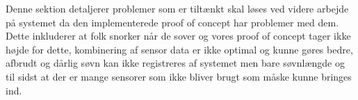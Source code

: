 Denne sektion detaljerer problemer som er tiltænkt skal løses ved videre arbejde på systemet da den implementerede proof of concept har problemer med dem. 
Dette inkluderer at folk snorker når de sover og vores proof of concept tager ikke højde for dette, kombinering af sensor data er ikke optimal og kunne gøres bedre, afbrudt og dårlig søvn kan ikke registreres af systemet men bare søvnlængde og til sidst at der er mange sensorer som ikke bliver brugt som måske kunne bringes ind.